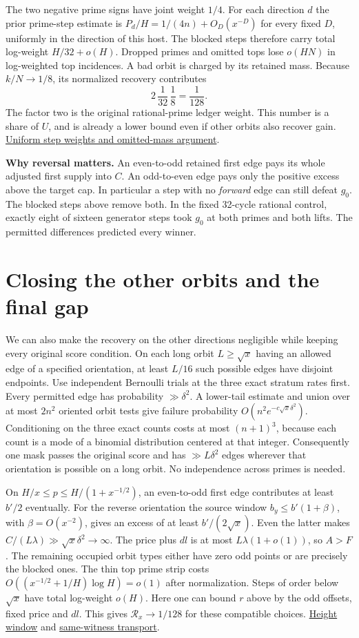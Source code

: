 \documentclass[12pt,letterpaper]{article}
\newcommand{\orig}[3]{\href{https://github.com/nousentllc/riemann-hypothesis/blob/40e56bab026552e089d7afcfeff08d2defb9c005/src/#1.lean\#L#2}{#3}}
\newcommand{\para}[1]{\par\medskip\noindent\textbf{#1}\quad}
\newcommand{\pagepart}[1]{\clearpage\section{#1}}
\begin{document}
The two negative prime signs have joint weight \(1/4\). For each direction \(d\) the prior prime-step estimate is \(P_d/H=1/(4n)+O_D(x^{-D})\) for every fixed \(D\), uniformly in the direction of this host. The blocked steps therefore carry total log-weight \(H/32+o(H)\). Dropped primes and omitted tops lose \(o(HN)\) in log-weighted top incidences. A bad orbit is charged by its retained mass. Because \(k/N\to1/8\), its normalized recovery contributes
\[
             2\,\frac{1}{32}\,\frac18=\frac1{128}.
\]
The factor two is the original rational-prime ledger weight. This number is a share of \(U\), and is already a lower bound even if other orbits also recover gain. \href{https://github.com/nousentllc/riemann-hypothesis/pull/10}{Uniform step weights and omitted-mass argument}.

\para{Why reversal matters.} An even-to-odd retained first edge pays its whole adjusted first supply into \(C\). An odd-to-even edge pays only the positive excess above the target cap. In particular a step with no \emph{forward} edge can still defeat \(g_0\). The blocked steps above remove both. In the fixed 32-cycle rational control, exactly eight of sixteen generator steps took \(g_0\) at both primes and both lifts. The permitted differences predicted every winner.

\pagepart{Closing the other orbits and the final gap}
We can also make the recovery on the other directions negligible while keeping every original score condition. On each long orbit \(L\ge\sqrt{x}\) having an allowed edge of a specified orientation, at least \(L/16\) such possible edges have disjoint endpoints. Use independent Bernoulli trials at the three exact stratum rates first. Every permitted edge has probability \(\gg\delta^2\). A lower-tail estimate and union over at most \(2n^2\) oriented orbit tests give failure probability \(O(n^2e^{-c\sqrt{x}\delta^2})\). Conditioning on the three exact counts costs at most \((n+1)^3\), because each count is a mode of a binomial distribution centered at that integer. Consequently one mask passes the original score and has \(\gg L\delta^2\) edges wherever that orientation is possible on a long orbit. No independence across primes is needed.

On \(H/x\le p\le H/(1+x^{-1/2})\), an even-to-odd first edge contributes at least \(b'/2\) eventually. For the reverse orientation the source window \(b_y\le b'(1+\beta)\), with \(\beta=O(x^{-2})\), gives an excess of at least \(b'/(2\sqrt{x})\). Even the latter makes \(C/(L\lambda)\gg\sqrt{x}\delta^2\to\infty\). The price plus \(dl\) is at most \(L\lambda(1+o(1))\), so \(A>F\). The remaining occupied orbit types either have zero odd points or are precisely the blocked ones. The thin top prime strip costs \(O((x^{-1/2}+1/H)\log H)=o(1)\) after normalization. Steps of order below \(\sqrt x\) have total log-weight \(o(H)\). Here one can bound \(r\) above by the odd offsets, fixed price and \(dl\). This gives \(\mathcal R_x\to1/128\) for these compatible choices. \orig{Formalism/SharpRestriction/FamCore}{123}{Height window} and \href{https://github.com/nousentllc/riemann-hypothesis/pull/11}{same-witness transport}.
\end{document}
